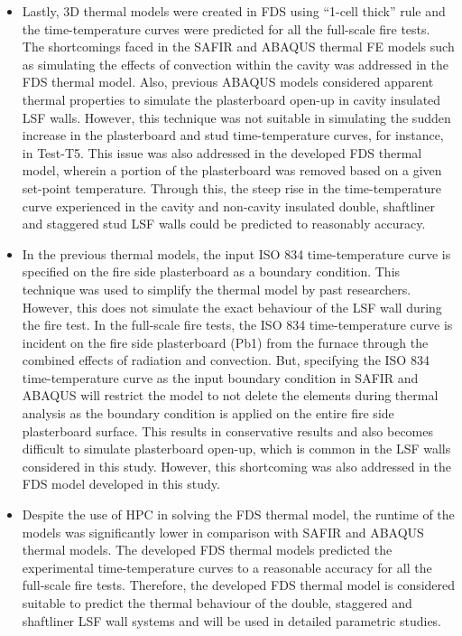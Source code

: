 \begin{itemize}
	\item Lastly, 3D thermal models were created in FDS using ``1-cell thick'' rule and the time-temperature curves were predicted for all the full-scale fire tests. The shortcomings faced in the SAFIR and ABAQUS thermal FE models such as simulating the effects of convection within the cavity was addressed in the FDS thermal model. Also, previous ABAQUS models considered apparent thermal properties to simulate the plasterboard open-up in cavity insulated LSF walls. However, this technique was not suitable in simulating the sudden increase in the plasterboard and stud time-temperature curves, for instance, in Test-T5. This issue was also addressed in the developed FDS thermal model, wherein a portion of the plasterboard was removed based on a given set-point temperature. Through this, the steep rise in the time-temperature curve experienced in the cavity and non-cavity insulated double, shaftliner and staggered stud LSF walls could be predicted to reasonably accuracy.
	\item In the previous thermal models, the input ISO 834 time-temperature curve is specified on the fire side plasterboard as a boundary condition. This technique was used to simplify the thermal model by past researchers. However, this does not simulate the exact behaviour of the LSF wall during the fire test. In the full-scale fire tests, the ISO 834 time-temperature curve is incident on the fire side plasterboard (Pb1) from the furnace through the combined effects of radiation and convection. But, specifying the ISO 834 time-temperature curve as the input boundary condition in SAFIR and ABAQUS will restrict the model to not delete the elements during thermal analysis as the boundary condition is applied on the entire fire side plasterboard surface. This results in conservative results and also becomes difficult to simulate plasterboard open-up, which is common in the LSF walls considered in this study. However, this shortcoming was also addressed in the FDS model developed in this study.
	\item Despite the use of HPC in solving the FDS thermal model, the runtime of the models was significantly lower in comparison with SAFIR and ABAQUS thermal models. The developed FDS thermal models predicted the experimental time-temperature curves to a reasonable accuracy for all the full-scale fire tests. Therefore, the developed FDS thermal model is considered suitable to predict the thermal behaviour of the double, staggered and shaftliner LSF wall systems and will be used in detailed parametric studies.
\end{itemize}

